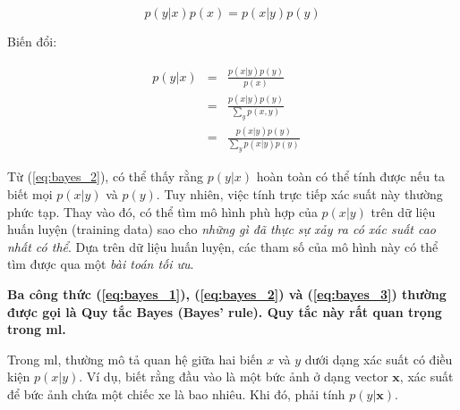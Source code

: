 \documentclass[../main-report.tex]{subfiles}
\begin{document}
\[
  p(y | x) p(x) = p(x | y) p(y)
\]

Biến đổi:

\begin{eqnarray}
  p(y | x)
  & = & \frac{p(x | y) p(y)}{p(x)} \label{eq:bayes_1} \\
  & = & \frac{p(x | y) p(y)}{\sum_{y} p(x, y)} \label{eq:bayes_2} \\
  & = & \frac{p(x |y) p(y)}{\sum_{y} p(x | y) p(y)} \quad \label{eq:bayes_3}
\end{eqnarray}

Từ (\ref{eq:bayes_2}), có thể thấy rằng \(p(y | x)\) hoàn toàn có thể tính được nếu ta biết mọi \(p(x | y)\) và \(p(y)\). Tuy nhiên, việc tính trực tiếp xác suất này thường phức tạp. Thay vào đó, có thể tìm mô hình phù hợp của \(p(x | y)\) trên dữ liệu huấn luyện (training data) sao cho \textit{những gì đã thực sự xảy ra có xác suất cao nhất có thể}. Dựa trên dữ liệu huấn luyện, các tham số của mô hình này có thể tìm được qua một \textit{bài toán tối ưu}.

\textbf{Ba công thức (\ref{eq:bayes_1}), (\ref{eq:bayes_2}) và (\ref{eq:bayes_3}) thường được gọi là Quy tắc Bayes (Bayes' rule). Quy tắc này rất quan trọng trong \gls{ml}.}

Trong \gls{ml}, thường mô tả quan hệ giữa hai biến \(x\) và \(y\) dưới dạng xác suất có điều kiện \(p(x|y)\). Ví dụ, biết rằng đầu vào là một bức ảnh ở dạng vector \(\mathbf{x}\), xác suất để bức ảnh chứa một chiếc xe là bao nhiêu. Khi đó, phải tính \(p(y | \mathbf{x})\).

%
%
%
%
%
%
\end{document}
